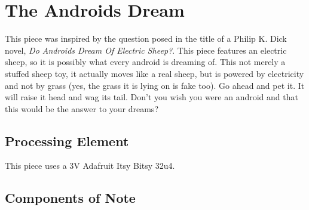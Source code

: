 %
%
%
%
% 
%
%
%
%
%
% 
%

\section{The Androids Dream}

This piece was inspired by the question posed in the title of a Philip K. Dick
novel, \textit{Do Androids Dream Of Electric Sheep?}. This piece features an
electric sheep, so it is possibly what every android is dreaming of. This not
merely a stuffed sheep toy, it actually moves like a real sheep, but is
powered by electricity and not by grass (yes, the grass it is lying on is fake
too). Go ahead and pet it. It will raise it head and wag its tail. Don't you
wish you were an android and that this would be the answer to your dreams?

\subsection*{Processing Element}

This piece uses a 3V Adafruit Itsy Bitsy 32u4.

\subsection*{Components of Note}

